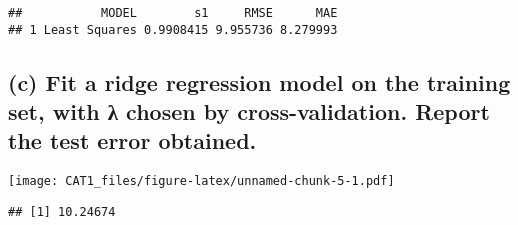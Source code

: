 \documentclass[
]{article}
\newenvironment{Shaded}{\begin{snugshade}}{\end{snugshade}}
\newcommand{\AttributeTok}[1]{\textcolor[rgb]{0.77,0.63,0.00}{#1}}
\newcommand{\CommentTok}[1]{\textcolor[rgb]{0.56,0.35,0.01}{\textit{#1}}}
\newcommand{\DecValTok}[1]{\textcolor[rgb]{0.00,0.00,0.81}{#1}}
\newcommand{\FunctionTok}[1]{\textcolor[rgb]{0.00,0.00,0.00}{#1}}
\newcommand{\NormalTok}[1]{#1}
\newcommand{\OtherTok}[1]{\textcolor[rgb]{0.56,0.35,0.01}{#1}}
\newcommand{\SpecialCharTok}[1]{\textcolor[rgb]{0.00,0.00,0.00}{#1}}
\begin{document}
\begin{verbatim}
##           MODEL        s1     RMSE      MAE
## 1 Least Squares 0.9908415 9.955736 8.279993
\end{verbatim}

\hypertarget{c-fit-a-ridge-regression-model-on-the-training-set-with-ux3bb-chosen-by-cross-validation.-report-the-test-error-obtained.}{%
\subsection{(c) Fit a ridge regression model on the training set, with λ
chosen by cross-validation. Report the test error
obtained.}\label{c-fit-a-ridge-regression-model-on-the-training-set-with-ux3bb-chosen-by-cross-validation.-report-the-test-error-obtained.}}

\begin{Shaded}
\end{Shaded}

\texttt{[image: CAT1\_files/figure-latex/unnamed-chunk-5-1.pdf]}

\begin{Shaded}
\end{Shaded}

\begin{verbatim}
## [1] 10.24674
\end{verbatim}
\end{document}
